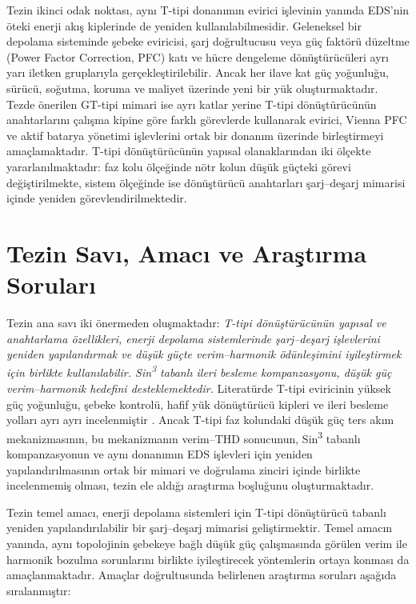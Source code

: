 Tezin ikinci odak noktası, aynı T-tipi donanımın evirici işlevinin yanında EDS'nin öteki enerji akış kiplerinde de yeniden kullanılabilmesidir. Geleneksel bir depolama sisteminde şebeke eviricisi, şarj doğrultucusu veya güç faktörü düzeltme (Power Factor Correction, PFC) katı ve hücre dengeleme dönüştürücüleri ayrı yarı iletken gruplarıyla gerçekleştirilebilir. Ancak her ilave kat güç yoğunluğu, sürücü, soğutma, koruma ve maliyet üzerinde yeni bir yük oluşturmaktadır. Tezde önerilen GT-tipi mimari ise ayrı katlar yerine T-tipi dönüştürücünün anahtarlarını çalışma kipine göre farklı görevlerde kullanarak evirici, Vienna PFC ve aktif batarya yönetimi işlevlerini ortak bir donanım üzerinde birleştirmeyi amaçlamaktadır. T-tipi dönüştürücünün yapısal olanaklarından iki ölçekte yararlanılmaktadır: faz kolu ölçeğinde nötr kolun düşük güçteki görevi değiştirilmekte, sistem ölçeğinde ise dönüştürücü anahtarları şarj--deşarj mimarisi içinde yeniden görevlendirilmektedir.
\section{Tezin Savı, Amacı ve Araştırma Soruları}
\label{sec:giris-amac}

Tezin ana savı iki önermeden oluşmaktadır: \emph{T-tipi dönüştürücünün yapısal ve anahtarlama özellikleri, enerji depolama sistemlerinde şarj--deşarj işlevlerini yeniden yapılandırmak ve düşük güçte verim--harmonik ödünleşimini iyileştirmek için birlikte kullanılabilir. Sin\textsuperscript{3} tabanlı ileri besleme kompanzasyonu, düşük güç verim--harmonik hedefini desteklemektedir.} Literatürde T-tipi eviricinin yüksek güç yoğunluğu, şebeke kontrolü, hafif yük dönüştürücü kipleri ve ileri besleme yolları ayrı ayrı incelenmiştir \citep{Blaabjerg2006,Wang2020,Chen2010,Lu2016}. Ancak T-tipi faz kolundaki düşük güç ters akım mekanizmasının, bu mekanizmanın verim--THD sonucunun, Sin\textsuperscript{3} tabanlı kompanzasyonun ve aynı donanımın EDS işlevleri için yeniden yapılandırılmasının ortak bir mimari ve doğrulama zinciri içinde birlikte incelenmemiş olması, tezin ele aldığı araştırma boşluğunu oluşturmaktadır.

Tezin temel amacı, enerji depolama sistemleri için T-tipi dönüştürücü tabanlı yeniden yapılandırılabilir bir şarj--deşarj mimarisi geliştirmektir. Temel amacın yanında, aynı topolojinin şebekeye bağlı düşük güç çalışmasında görülen verim ile harmonik bozulma sorunlarını birlikte iyileştirecek yöntemlerin ortaya konması da amaçlanmaktadır. Amaçlar doğrultusunda belirlenen araştırma soruları aşağıda sıralanmıştır:

